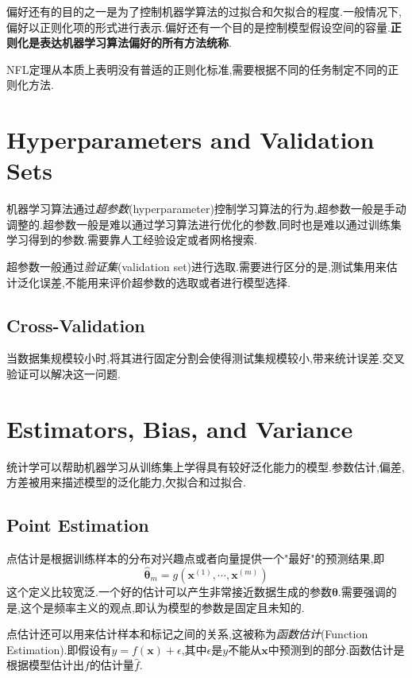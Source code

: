 偏好还有的目的之一是为了控制机器学算法的过拟合和欠拟合的程度.一般情况下,偏好以正则化项的形式进行表示.偏好还有一个目的是控制模型假设空间的容量.\textbf{正则化是表达机器学习算法偏好的所有方法统称}.

NFL定理从本质上表明没有普适的正则化标准,需要根据不同的任务制定不同的正则化方法.

\section{Hyperparameters and Validation Sets}

机器学习算法通过\textit{超参数}(hyperparameter)控制学习算法的行为,超参数一般是手动调整的.超参数一般是难以通过学习算法进行优化的参数,同时也是难以通过训练集学习得到的参数.需要靠人工经验设定或者网格搜索.

超参数一般通过\textit{验证集}(validation set)进行选取.需要进行区分的是,测试集用来估计泛化误差,不能用来评价超参数的选取或者进行模型选择.

\subsection{Cross-Validation}

当数据集规模较小时,将其进行固定分割会使得测试集规模较小,带来统计误差.交叉验证可以解决这一问题.

\section{Estimators, Bias, and Variance}

统计学可以帮助机器学习从训练集上学得具有较好泛化能力的模型.参数估计,偏差,方差被用来描述模型的泛化能力,欠拟合和过拟合.

\subsection{Point Estimation}

点估计是根据训练样本的分布对兴趣点或者向量提供一个"最好"的预测结果,即
\begin{equation}
\hat{\bm\theta}_m=g(\bm x^{(1)},\cdots,\bm x^{(m)})
\end{equation}
这个定义比较宽泛.一个好的估计可以产生非常接近数据生成的参数$\bm{\bm\theta}$.需要强调的是,这个是频率主义的观点,即认为模型的参数是固定且未知的.

点估计还可以用来估计样本和标记之间的关系,这被称为\textit{函数估计}(Function Estimation).即假设有$y=f(\bm x)+\epsilon$,其中$\epsilon$是$y$不能从$\bm x$中预测到的部分.函数估计是根据模型估计出$f$的估计量$\hat f$.

